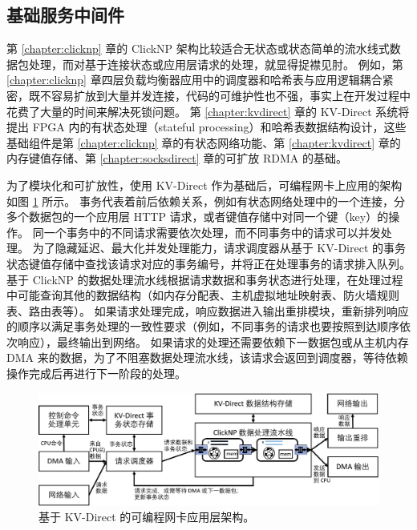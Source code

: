 \subsection{基础服务中间件}

第 \ref{chapter:clicknp} 章的 ClickNP 架构比较适合无状态或状态简单的流水线式数据包处理，而对基于连接状态或应用层请求的处理，就显得捉襟见肘。
例如，第 \ref{chapter:clicknp} 章四层负载均衡器应用中的调度器和哈希表与应用逻辑耦合紧密，既不容易扩放到大量并发连接，代码的可维护性也不强，事实上在开发过程中花费了大量的时间来解决死锁问题。
第 \ref{chapter:kvdirect} 章的 KV-Direct 系统将提出 FPGA 内的有状态处理（stateful processing）和哈希表数据结构设计，这些基础组件是第 \ref{chapter:clicknp} 章的有状态网络功能、第 \ref{chapter:kvdirect} 章的内存键值存储、第 \ref{chapter:socksdirect} 章的可扩放 RDMA 的基础。

为了模块化和可扩放性，使用 KV-Direct 作为基础后，可编程网卡上应用的架构如图 \ref{arch:fig:kvdirect_arch} 所示。
事务代表着前后依赖关系，例如有状态网络处理中的一个连接，分多个数据包的一个应用层 HTTP 请求，或者键值存储中对同一个键（key）的操作。
同一个事务中的不同请求需要依次处理，而不同事务中的请求可以并发处理。
为了隐藏延迟、最大化并发处理能力，请求调度器从基于 KV-Direct 的事务状态键值存储中查找该请求对应的事务编号，并将正在处理事务的请求排入队列。
基于 ClickNP 的数据处理流水线根据请求数据和事务状态进行处理，在处理过程中可能查询其他的数据结构（如内存分配表、主机虚拟地址映射表、防火墙规则表、路由表等）。
如果请求处理完成，响应数据进入输出重排模块，重新排列响应的顺序以满足事务处理的一致性要求（例如，不同事务的请求也要按照到达顺序依次响应），最终输出到网络。
如果请求的处理还需要依赖下一数据包或从主机内存 DMA 来的数据，为了不阻塞数据处理流水线，该请求会返回到调度器，等待依赖操作完成后再进行下一阶段的处理。


\begin{figure}[htbp]
	\centering
	\includegraphics[width=1.0\textwidth]{figures/kvdirect_arch.pdf}
	\caption{基于 KV-Direct 的可编程网卡应用层架构。}
	\label{arch:fig:kvdirect_arch}
\end{figure}
